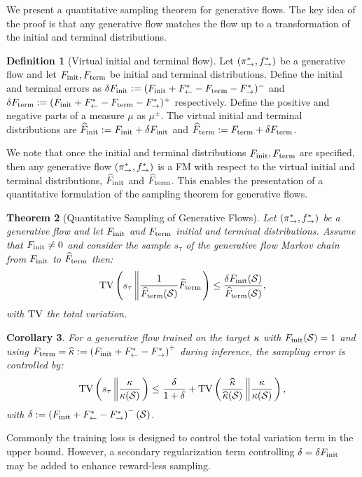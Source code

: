 \documentclass{article}
\theoremstyle{plain}
\newtheorem{theorem}{Theorem}[section]
\newtheorem{corollary}[theorem]{Corollary}
\theoremstyle{definition}
\newtheorem{definition}[theorem]{Definition}
\theoremstyle{remark}
\theoremstyle{fact}
\begin{document}
We present a quantitative sampling theorem for generative flows. The key idea of the proof is that any generative flow matches the flow up to a transformation of the initial and terminal distributions.

\begin{definition}[Virtual initial and terminal flow]\label{def:virtual_flows} Let $(\pi_{\rightarrow}^*,f^*_{\rightarrow})$ be a generative flow and let $F_{\mathrm{init}},F_{\mathrm{term}}$ be initial and terminal distributions. Define the initial and terminal errors as $\delta F_{\mathrm{init}}:=(F_{\mathrm{init}}+F^*_{\leftarrow}-F_{\mathrm{term}}-F^*_{\rightarrow})^-$ and $\delta F_{\mathrm{term}}:=(F_{\mathrm{init}}+F^*_{\leftarrow}-F_{\mathrm{term}}-F^*_{\rightarrow})^+$ respectively. Define the positive and negative parts of a measure $\mu$ as ${\mu}^\pm$.
The virtual initial and terminal distributions are $\widehat {F}_{\mathrm{init}} := F_{\mathrm{init}}+ \delta F_{\mathrm{init}}$ and $\widehat{F}_{\mathrm{term}} := F_{\mathrm{term}}+ \delta F_{\mathrm{term}}$.
\end{definition}

We note that once the initial and terminal distributions $F_{\mathrm{init}},F_{\mathrm{term}}$ are specified, then any generative flow $(\pi_{\rightarrow}^*,f^*_{\rightarrow})$ is a FM with respect to the virtual initial and terminal distributions, $\widehat {F}_{\mathrm{init}}$ and $\widehat{F}_{\mathrm{term}}$. This enables the presentation of a quantitative formulation of the sampling theorem for generative flows. 
\begin{theorem}[Quantitative Sampling of Generative Flows]
\label{theo:negative_control}
    Let $(\pi_{\rightarrow}^*, f^*_{\rightarrow})$ be a generative flow and let $F_{\mathrm{init}}$ and $F_{\mathrm{term}}$ initial and terminal distributions. Assume that $F_{\mathrm{init}}\neq 0$ and consider the sample $s_\tau$ of the generative flow Markov chain from $F_{\mathrm{init}}$ to $\widehat{F}_{\mathrm{term}}$ then:
    \begin{equation}
        \mathrm{TV}\left(s_\tau \left\| \frac{1}{\widehat{F}_{\mathrm{term}}(\mathcal S )} \widehat{F}_{\mathrm{term}}\right.\right) \leq  \frac{\delta F_{\mathrm{init}}(\mathcal S)}{\widehat{F}_{\mathrm{term}}(\mathcal S)},
    \end{equation}
    with $\mathrm{TV}$  the total variation.
\end{theorem}
\begin{corollary}\label{cor:sampling_error_control} For a generative flow trained on the target $\kappa$ with $F_{\mathrm{init}}(\mathcal S)=1$ and using $F_{\mathrm{term}}=\widehat{\kappa} := \left(F_{\mathrm{init}}+F^*_{\leftarrow}-F^*_{\rightarrow}\right)^+$ during inference, the sampling error is controlled by:
    \begin{eqnarray}
      \mathrm{TV}\left(s_\tau \left\| \frac{\kappa}{\kappa(\mathcal S )} \right.\right) \leq  \frac{\delta}{1+\delta}+\mathrm{TV}\left(\frac{\widehat{\kappa}}{\widehat{\kappa}(\mathcal S)} \left\| \frac{\kappa}{\kappa(\mathcal S )} \right.\right),
\end{eqnarray}
with $\delta :=  \left(F_{\mathrm{init}}+F^*_{\leftarrow}-F^*_{\rightarrow}\right)^-(\mathcal S)$.
\end{corollary}
Commonly the training loss is designed to control the total variation term in the upper bound. However, a secondary regularization term controlling $\delta =\delta F_{\mathrm{init}}$ may be added to enhance reward-less sampling. 
\end{document}
